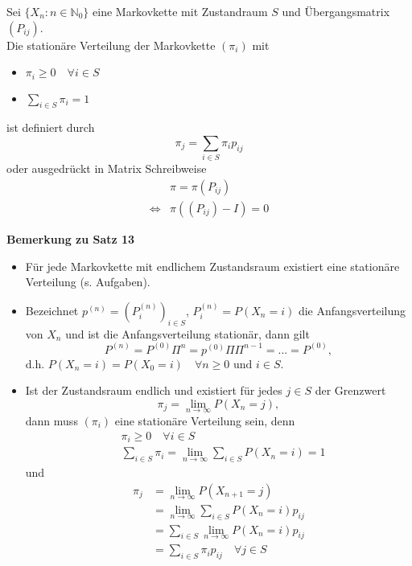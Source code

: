 \documentclass[a4paper,12pt]{article}
\begin{document}
\begin{tcolorbox}[breakable, colframe=green, colback=white, title=Satz 13]
Sei $\{X_n: n \in \mathbb{N}_0\}$ eine Markovkette mit Zustandraum $S$ und Übergangsmatrix $(P_{ij})$.\\
Die stationäre Verteilung der Markovkette  $(\pi_i)$ mit 
\begin{itemize}
\item $\pi_i \geq 0 \quad \forall i \in S$
\item $\sum_{i \in S}\pi_i = 1$
\end{itemize}
ist definiert durch
$$
\pi_j = \sum_{i \in S}\pi_i p_{ij}
$$
oder ausgedrückt in Matrix Schreibweise
\begin{align*}
&\pi = \pi(P_{ij}) \\
\Leftrightarrow &\pi((P_{ij}) - I) = 0
\end{align*}
\end{tcolorbox}

\textbf{Bemerkung zu Satz 13}\\
\begin{itemize}
\item Für jede Markovkette mit endlichem Zustandsraum existiert eine stationäre Verteilung (s. Aufgaben).
\item Bezeichnet $p^{(n)} = (P_i^{(n)})_{i \in S}$, $P_i^{(n)} = P(X_n = i)$ die Anfangsverteilung
von $X_n$ und ist die Anfangsverteilung stationär, dann gilt 
$$
P^{(n)} = P^{(0)}\Pi^n = p^{(0)}\Pi\Pi^{n-1} = ... = P^{(0)},
$$
d.h. $P(X_n = i) = P(X_0 = i) \quad \forall n \geq 0 \text{ und } i \in S$.
\item Ist der Zustandsraum endlich und existiert für jedes $j \in S$ der Grenzwert
$$
\pi_j = \lim_{n \to \infty}P(X_n = j),
$$
dann muss $(\pi_i)$ eine stationäre Verteilung sein, denn
\begin{align*}
&\pi_i \geq 0 \quad \forall i \in S \\
& \sum_{i \in S} \pi_i = \lim_{n \to \infty}\sum_{i \in S}P(X_n = i) = 1
\end{align*}
und
\begin{align*}
\pi_j & = \lim_{n \to \infty}P(X_{n+1} = j)\\
& = \lim_{n \to \infty} \sum_{i \in S}P(X_n = i)p_{ij} \\
& = \sum_{i \in S}\lim_{n \to \infty}P(X_n = i)p_{ij} \\
& = \sum_{i \in S}\pi_i p_{ij} \quad \forall j \in S
\end{align*}
\end{itemize}
\end{document}
